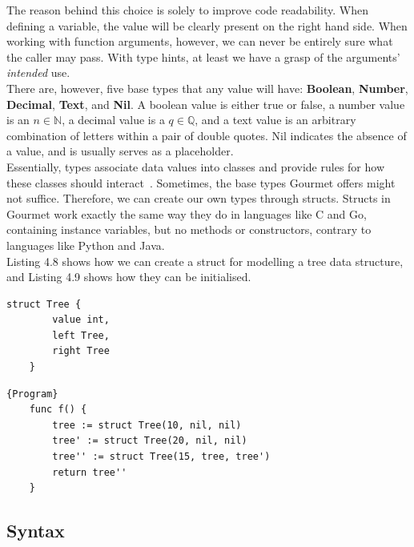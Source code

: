 The reason behind this choice is solely to improve code readability. When defining a variable, the value will be clearly present on the right hand side. When working with function arguments, however, we can never be entirely sure what the caller may pass. With type hints, at least we have a grasp of the arguments' \textit{intended} use. \hfill \\

There are, however, five base types that any value will have: \textbf{Boolean}, \textbf{Number}, \textbf{Decimal}, \textbf{Text}, and \textbf{Nil}. A boolean value is either true or false, a number value is an  $n \in \mathbb{N}$, a decimal value is a $q \in \mathbb{Q}$, and a text value is an arbitrary combination of letters within a pair of double quotes. Nil indicates the absence of a value, and is usually serves as a placeholder. \hfill \\

Essentially, types associate data values into classes and provide rules for how these classes should interact~\cite{pierce2002types, LYAH}. Sometimes, the base types Gourmet offers might not suffice. Therefore, we can create our own types through structs. Structs in Gourmet work exactly the same way they do in languages like C and Go, containing instance variables, but no methods or constructors, contrary to languages like Python and Java. \hfill \\

Listing 4.8 shows how we can create a struct for modelling a tree data structure, and Listing 4.9 shows how they can be initialised. \hfill \\

\begin{lstlisting}[caption={A Gourmet struct Tree, with instance variables value, left and right}, captionpos=b]
    struct Tree {
        value int,
        left Tree,
        right Tree
    }
\end{lstlisting}

\begin{lstlisting}[caption=A function to initialise three tree structs and return the last one,captionpos=b]{Program}
    func f() {
        tree := struct Tree(10, nil, nil)
        tree' := struct Tree(20, nil, nil)
        tree'' := struct Tree(15, tree, tree')
        return tree''
    }
\end{lstlisting}

\subsection{Syntax}

